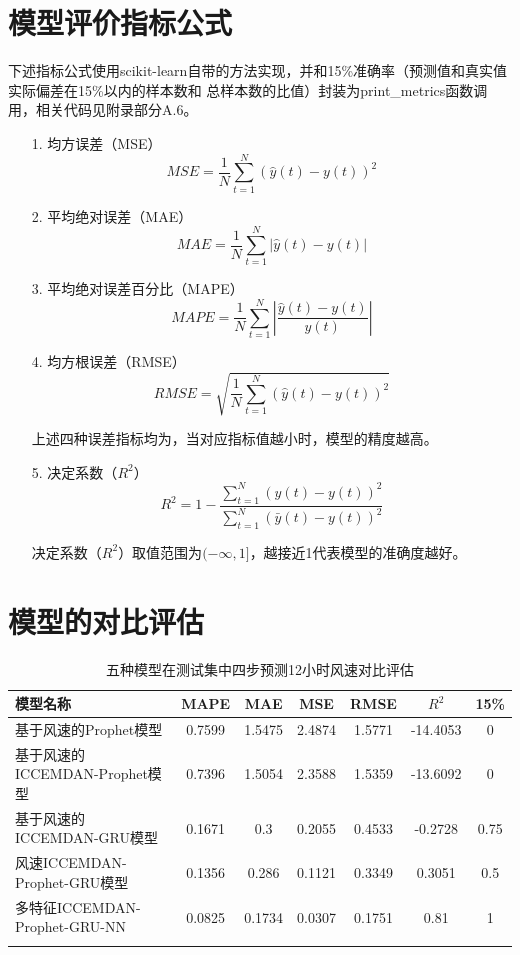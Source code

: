 \documentclass[AutoFakeBold]{LZUThesis}
\begin{document}
\section{模型评价指标公式}
下述指标公式使用scikit-learn自带的方法实现，并和15\%准确率（预测值和真实值实际偏差在15\%以内的样本数和
总样本数的比值）封装为print\_metrics函数调用，相关代码见附录部分A.6。
\begin{itemize}
\item[1. ] 均方误差（MSE）
$$MSE=\frac{1}{N}\sum_{t=1}^{N}\left(\hat{y}\left(t\right)-y\left(t\right)\right)^2$$

\item[2. ] 平均绝对误差（MAE）
$$MAE=\frac{1}{N}\sum_{t=1}^{N}\left|\hat{y}\left(t\right)-y\left(t\right)\right|$$

\item[3. ] 平均绝对误差百分比（MAPE）
$$MAPE=\frac{1}{N}\sum_{t=1}^{N}\left|\frac{\hat{y}\left(t\right)-y\left(t\right)}{y\left(t\right)}\right|$$

\item[4. ] 均方根误差（RMSE）
$$RMSE=\sqrt{\frac{1}{N}\sum_{t=1}^{N}\left(\hat{y}\left(t\right)-y\left(t\right)\right)^2}$$

上述四种误差指标均为，当对应指标值越小时，模型的精度越高。

\item[5. ] 决定系数（$R^2$）
$$R^2=1-\frac{\sum_{t=1}^{N}(\hat{y}\left(t\right)-y\left(t\right))^2}{\sum_{t=1}^{N}(\bar{y}\left(t\right)-y\left(t\right))^2}$$

决定系数（$R^2$）取值范围为$(-\infty, 1]$，越接近1代表模型的准确度越好。
\end{itemize}

\section{模型的对比评估}

\begin{table}[H]
    \centering
    \caption{五种模型在测试集中四步预测12小时风速对比评估}
    \begin{tabular}{lcccccc}
    \toprule
    模型名称 & MAPE & MAE & MSE & RMSE & $R^2$ & 15\% \\
    \midrule
    基于风速的Prophet模型 & 0.7599 & 1.5475 & 2.4874 & 1.5771 & -14.4053 & 0 \\
    基于风速的ICCEMDAN-Prophet模型 & 0.7396 & 1.5054 & 2.3588 & 1.5359 & -13.6092 & 0 \\
    基于风速的ICCEMDAN-GRU模型 & 0.1671 & 0.3 & 0.2055 & 0.4533 & -0.2728 & 0.75 \\
    风速ICCEMDAN-Prophet-GRU模型 & 0.1356 & 0.286 & 0.1121 & 0.3349 & 0.3051 & 0.5 \\
    多特征ICCEMDAN-Prophet-GRU-NN & 0.0825 & 0.1734 & 0.0307 & 0.1751 & 0.81 & 1 \\
    \bottomrule \\
    \end{tabular} \\
    \label{models-metrics}
\end{table}
\end{document}
